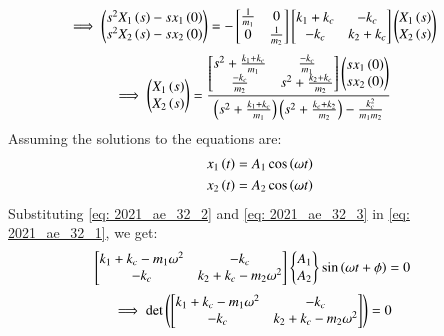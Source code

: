\documentclass[journal,12pt,twocolumn]{IEEEtran}
\theoremstyle{remark}
\begin{document}
\newpage
\begin{align}
\implies \begin{pmatrix}
s^2 X_1\left(s\right)-sx_1\left(0\right)\\
s^2 X_2\left(s\right)-sx_2\left(0\right)
\end{pmatrix} &=-
\begin{bmatrix}
\frac{1}{m_1}&0\\
0&\frac{1}{m_2}\end{bmatrix}
\begin{bmatrix}
k_1+k_c&-k_c\\
-k_c&k_2+k_c\end{bmatrix}
\begin{pmatrix}
X_1\left(s\right)\\
X_2\left(s\right)
\end{pmatrix}
\end{align}
\begin{align}
\implies  \begin{pmatrix}
X_1\left(s\right)\\
X_2\left(s\right)
\end{pmatrix} &=
\frac{\begin{bmatrix}
s^2+\frac{k_1+k_c}{m_1}&\frac{-k_c}{m_1}\\
\frac{-k_c}{m_2}&s^2+\frac{k_2+k_c}{m_2}\end{bmatrix}
\begin{pmatrix}
sx_1\left(0\right)\\
sx_2\left(0\right)
\end{pmatrix}}
{\left(s^2+\frac{k_1+k_c}{m_1}\right)\left(s^2+\frac{k_c+k_2}{m_2}\right)-\frac{k_c^2}{m_1m_2}}
\end{align}
Assuming the solutions to the equations are:
\begin{align}
x_1\left(t\right) &= A_1\cos{\ensuremath{\left(\omega t\right)}} \label{eq: 2021_ae_32_2}\\
x_2\left(t\right) &= A_2\cos{\ensuremath{\left(\omega t\right)}} \label{eq: 2021_ae_32_3}
\end{align}
Substituting \eqref{eq: 2021_ae_32_2} and \eqref{eq: 2021_ae_32_3} in \eqref{eq: 2021_ae_32_1}, we get:
\begin{align}
\begin{bmatrix}
k_1+k_c- m_1\omega^2&-k_c\\
-k_c&k_2+k_c-m_2\omega^2\end{bmatrix}
\begin{Bmatrix}
A_1\\
A_2
\end{Bmatrix}
\sin{\ensuremath{\left(\omega t+ \phi\right)}} &=0\label{eq: 2021_ae_32_4}
\end{align}
\begin{align}
\implies \det\left(\begin{bmatrix}
k_1+k_c- m_1\omega ^2&-k_c\\
-k_c&k_2+k_c-m_2\omega ^2\end{bmatrix}\right) &=0 \label{eq: 2021_ae_32_5}
\end{align}
\end{document}
